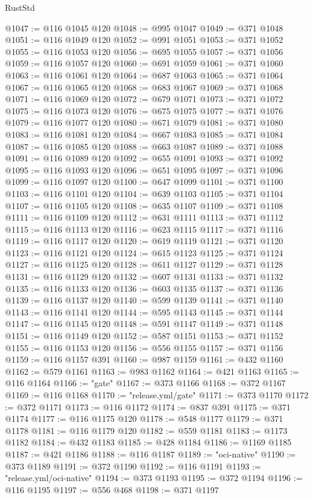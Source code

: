 \begin{lexlean}{RustStd}
\begin{coremodule}
@1047 := @116 @1045 @120
@1048 := @995 @1047
@1049 := @371 @1048
@1051 := @116 @1049 @120
@1052 := @991 @1051
@1053 := @371 @1052
@1055 := @116 @1053 @120
@1056 := @695 @1055
@1057 := @371 @1056
@1059 := @116 @1057 @120
@1060 := @691 @1059
@1061 := @371 @1060
@1063 := @116 @1061 @120
@1064 := @687 @1063
@1065 := @371 @1064
@1067 := @116 @1065 @120
@1068 := @683 @1067
@1069 := @371 @1068
@1071 := @116 @1069 @120
@1072 := @679 @1071
@1073 := @371 @1072
@1075 := @116 @1073 @120
@1076 := @675 @1075
@1077 := @371 @1076
@1079 := @116 @1077 @120
@1080 := @671 @1079
@1081 := @371 @1080
@1083 := @116 @1081 @120
@1084 := @667 @1083
@1085 := @371 @1084
@1087 := @116 @1085 @120
@1088 := @663 @1087
@1089 := @371 @1088
@1091 := @116 @1089 @120
@1092 := @655 @1091
@1093 := @371 @1092
@1095 := @116 @1093 @120
@1096 := @651 @1095
@1097 := @371 @1096
@1099 := @116 @1097 @120
@1100 := @647 @1099
@1101 := @371 @1100
@1103 := @116 @1101 @120
@1104 := @639 @1103
@1105 := @371 @1104
@1107 := @116 @1105 @120
@1108 := @635 @1107
@1109 := @371 @1108
@1111 := @116 @1109 @120
@1112 := @631 @1111
@1113 := @371 @1112
@1115 := @116 @1113 @120
@1116 := @623 @1115
@1117 := @371 @1116
@1119 := @116 @1117 @120
@1120 := @619 @1119
@1121 := @371 @1120
@1123 := @116 @1121 @120
@1124 := @615 @1123
@1125 := @371 @1124
@1127 := @116 @1125 @120
@1128 := @611 @1127
@1129 := @371 @1128
@1131 := @116 @1129 @120
@1132 := @607 @1131
@1133 := @371 @1132
@1135 := @116 @1133 @120
@1136 := @603 @1135
@1137 := @371 @1136
@1139 := @116 @1137 @120
@1140 := @599 @1139
@1141 := @371 @1140
@1143 := @116 @1141 @120
@1144 := @595 @1143
@1145 := @371 @1144
@1147 := @116 @1145 @120
@1148 := @591 @1147
@1149 := @371 @1148
@1151 := @116 @1149 @120
@1152 := @587 @1151
@1153 := @371 @1152
@1155 := @116 @1153 @120
@1156 := @556 @1155
@1157 := @371 @1156
@1159 := @116 @1157 @391
@1160 := @987 @1159
@1161 := @432 @1160
@1162 := @579 @1161
@1163 := @983 @1162
@1164 := @421 @1163
@1165 := @116 @1164
@1166 := "gate"
@1167 := @373 @1166
@1168 := @372 @1167
@1169 := @116 @1168
@1170 := "release.yml/gate"
@1171 := @373 @1170
@1172 := @372 @1171
@1173 := @116 @1172
@1174 := @837 @391
@1175 := @371 @1174
@1177 := @116 @1175 @120
@1178 := @548 @1177
@1179 := @371 @1178
@1181 := @116 @1179 @120
@1182 := @559 @1181
@1183 := @1173 @1182
@1184 := @432 @1183
@1185 := @428 @1184
@1186 := @1169 @1185
@1187 := @421 @1186
@1188 := @116 @1187
@1189 := "oci-native"
@1190 := @373 @1189
@1191 := @372 @1190
@1192 := @116 @1191
@1193 := "release.yml/oci-native"
@1194 := @373 @1193
@1195 := @372 @1194
@1196 := @116 @1195
@1197 := @556 @468
@1198 := @371 @1197

\end{coremodule}
\end{lexlean}

